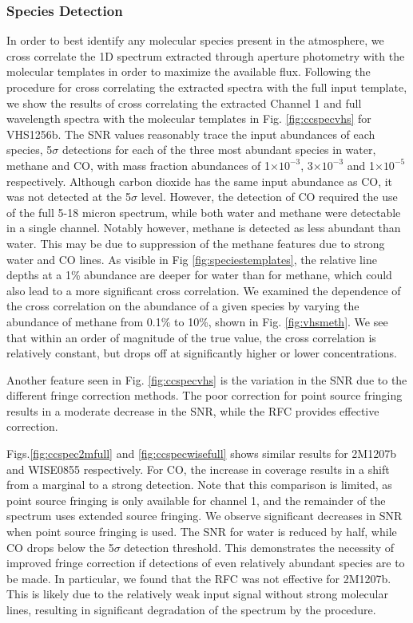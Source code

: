 \subsubsection{Species Detection}
In order to best identify any molecular species present in the atmosphere, we cross correlate the 1D spectrum extracted through aperture photometry with the molecular templates in order to maximize the available flux.
Following the procedure for cross correlating the extracted spectra with the full input template, we show the results of cross correlating the extracted Channel 1 and full wavelength spectra with the molecular templates in Fig. \ref{fig:ccspecvhs} for VHS1256b.
The SNR values reasonably trace the input abundances of each species, 5$\sigma$ detections for each of the three most abundant species in water, methane and CO, with mass fraction abundances of 1$\times10^{-3}$, 3$\times10^{-3}$ and 1$\times10^{-5}$ respectively. 
Although carbon dioxide has the same input abundance as CO, it was not detected at the 5$\sigma$ level.
However, the detection of CO required the use of the full 5-18 micron spectrum, while both water and methane were detectable in a single channel.
Notably however, methane is detected as less abundant than water. 
This may be due to suppression of the methane features due to strong water and CO lines. 
As visible in Fig \ref{fig:speciestemplates}, the relative line depths at a 1\% abundance are deeper for water than for methane, which could also lead to a more significant cross correlation.
We examined the dependence of the cross correlation on the abundance of a given species by varying the abundance of methane from 0.1\% to 10\%, shown in Fig. \ref{fig:vhsmeth}.
We see that within an order of magnitude of the true value, the cross correlation is relatively constant, but drops off at significantly higher or lower concentrations.

Another feature seen in Fig. \ref{fig:ccspecvhs} is the variation in the SNR due to the different fringe correction methods. 
The poor correction for point source fringing results in a moderate decrease in the SNR, while the RFC provides effective correction.

Figs.\ref{fig:ccspec2mfull} and \ref{fig:ccspecwisefull} shows similar results for 2M1207b and WISE0855 respectively. 
For CO, the increase in coverage results in a shift from a marginal to a strong detection.
Note that this comparison is limited, as point source fringing is only available for channel 1, and the remainder of the spectrum uses extended source fringing.
We observe significant decreases in SNR when point source fringing is used.
The SNR for water is reduced by half, while CO drops below the 5$\sigma$ detection threshold.
This demonstrates the necessity of improved fringe correction if detections of even relatively abundant species are to be made.
In particular, we found that the RFC was not effective for 2M1207b. 
This is likely due to the relatively weak input signal without strong molecular lines, resulting in significant degradation of the spectrum by the procedure.

